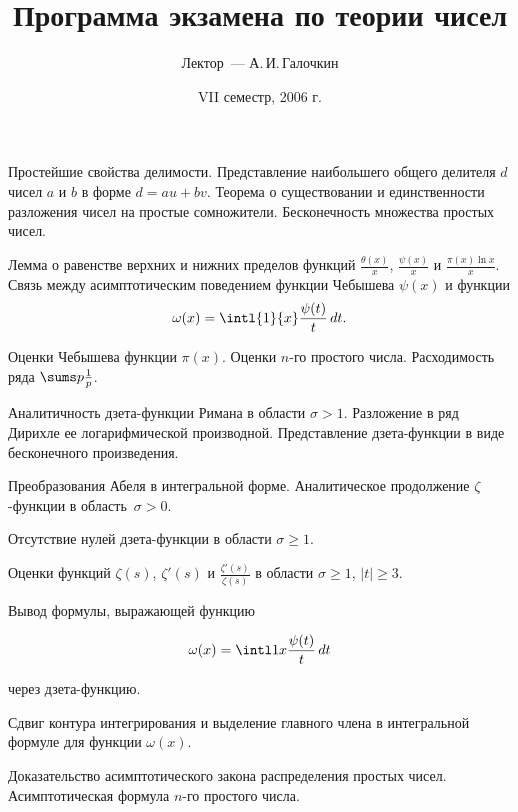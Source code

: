 \documentclass[a4paper,draft]{article}
\title{Программа экзамена по теории чисел}
\author{Лектор~--- А.\,И.\,Галочкин}
\date{VII семестр, 2006 г.}
\begin{document}
\maketitle

\begin{nums}{0}
\item Простейшие свойства делимости. Представление наибольшего общего
делителя $d$ чисел $a$ и  $b$ в форме  $d=au+bv$. Теорема о
существовании и единственности разложения чисел на простые
сомножители. Бесконечность множества простых чисел.

\item Лемма о равенстве верхних и нижних пределов функций
$\frac{\theta (x)}{x}$, $\frac{\psi (x)}{x}$ и $\frac{\pi (x) \ln x}{x}$. Связь между
асимптотическим поведением функции Чебышева $\psi (x)$ и функции
$$ \omega (x)=  \intl{1}{x} \frac {\psi (t)}{t} \, dt.$$

\item Оценки Чебышева функции  $\pi (x)$. Оценки $n$-го простого
числа. Расходимость ряда $ {\sums p \frac 1p}$.

\item Аналитичность дзета-функции Римана в области $\sigma >1$.
Разложение в ряд Дирихле ее логарифмической производной.
Представление дзета-функции в виде бесконечного произведения.

\item Преобразования Абеля в интегральной форме. Аналитическое
продолжение $\zeta$-функции в область~${\sigma >0}$.

\item Отсутствие нулей дзета-функции в области $\sigma \ge 1$.

\item Оценки функций $\zeta (s)$, $\zeta '(s)$  и $\frac{\zeta'(s)}{\zeta (s)}$ в области $\sigma \ge 1$, $|t| \ge 3$.

\item Вывод формулы, выражающей функцию

$$ \omega (x)= \intl 1x \frac {\psi (t)}{t} \, dt$$

через дзета-функцию.

\item Сдвиг контура интегрирования и выделение главного члена в
интегральной формуле для функции    $\omega (x)$.

\item Доказательство асимптотического закона распределения простых
чисел. Асимптотическая формула   $n$-го простого числа.


\end{nums}
\end{document}
